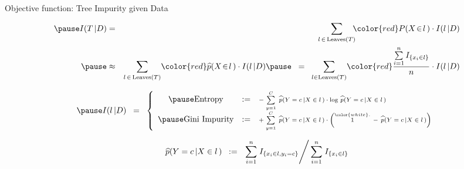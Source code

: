 
\begin{frame}{\vskip -0.2cm \large Objective function: Tree Impurity given Data}

\vskip -0.3cm

\begin{eqnarray*}
\pause
I(T\,\vert D)
& = &
	\underset{l\,\in\,\textnormal{Leaves}(T)}{\sum}\!\!
	{\color{red}P(X \!\in\! l\,)} \cdot I(l\,\vert D)
\\
\pause
& \approx &
	\underset{l\,\in\,\textnormal{Leaves}(T)}{\sum}
	{\color{red}\widehat{p}(X \!\in\! l\,)} \cdot I(l\,\vert D)
\pause
\;\; = \;\;
	\underset{l\in\textnormal{Leaves}(T)}{\sum}
	{\color{red}\dfrac{\overset{n}{\underset{i=1}{\sum}}\,I_{\{x_{i} \in l\}}}{n}} \cdot I(l\,\vert D)
\end{eqnarray*}

\small
\begin{equation*}
\pause
I(l\,\vert D)
\;\; = \;\;
\left\{\begin{array}{ccl}
\pause
\textnormal{Entropy}
& := &
	\textnormal{\scriptsize$-\;\overset{C}{\underset{y=1}{\sum}}\;\,
	\widehat{p}(Y=c\,\vert X\in l\,) \cdot \log\,\widehat{p}(Y=c\,\vert X\in l\,)$}
\\
\pause
\textnormal{Gini Impurity}
& := &
	\textnormal{\scriptsize$+\;\overset{C}{\underset{y=1}{\sum}}\;\,
	\widehat{p}(Y=c\,\vert X\in l\,) \cdot
	\left(\overset{{\color{white}.}}{1}\,-\,\widehat{p}(Y=c\,\vert X\in l\,)\right)$}
\end{array}\right.
\end{equation*}

\pause
\vskip -0.5cm

\footnotesize
\begin{equation*}
\widehat{p}(Y=c\,\vert X\in l\,)
\;\; := \;\;
	\left.\overset{n}{\underset{i=1}{\sum}}\; I_{\{x_{i}\in l, y_{i} = c\}} \right\slash
	\overset{n}{\underset{i=1}{\sum}}\; I_{\{x_{i}\in l\}}
\end{equation*}

\end{frame}
\normalsize



